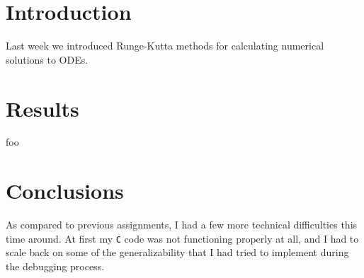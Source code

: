 \documentclass{article}
\author{\hwauthor}
\title{\hwtitle}
\date{\hwdate}
\begin{document}
\maketitle
\thispagestyle{fancy}

\section{Introduction}

Last week we introduced Runge-Kutta methods for calculating numerical solutions to ODEs.

\section{Results}

\bigskip
{}
\medskip

foo

\section{Conclusions}

As compared to previous assignments, I had a few more technical difficulties this time around. At first my \texttt{C} code was not functioning properly at all, and I had to scale back on some of the generalizability that I had tried to implement during the debugging process.
\end{document}
